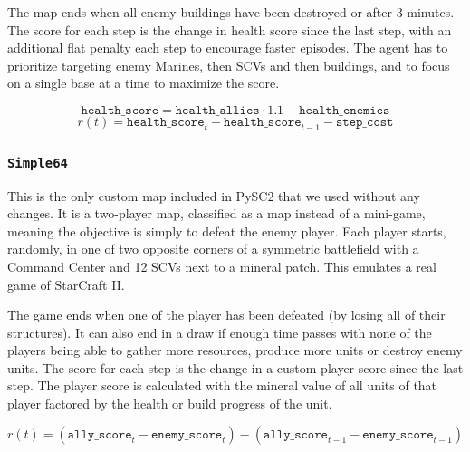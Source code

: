 The map ends when all enemy buildings have been destroyed or after 3 minutes. The score for each step is the change in health score since the last step, with an additional flat penalty each step to encourage faster episodes. The agent has to prioritize targeting enemy Marines, then SCVs and then buildings, and to focus on a single base at a time to maximize the score.

$$
\texttt{health\_score} = \texttt{health\_allies} \cdot 1.1 - \texttt{health\_enemies}
$$
$$
r(t) = \texttt{health\_score}_{t} - \texttt{health\_score}_{t-1} - \texttt{step\_cost}
$$

\subsubsection*{\texttt{Simple64}}

This is the only custom map included in PySC2 that we used without any changes. It is a two-player map, classified as a  map instead of a mini-game, meaning the objective is simply to defeat the enemy player. Each player starts, randomly, in one of two opposite corners of a symmetric battlefield with a Command Center and 12 SCVs next to a mineral patch. This emulates a real game of StarCraft II.

The game ends when one of the player has been defeated (by losing all of their structures). It can also end in a draw if enough time passes with none of the players being able to gather more resources, produce more units or destroy enemy units. The score for each step is the change in a custom player score since the last step. The player score is calculated with the mineral value of all units of that player factored by the health or build progress of the unit.

$$
r(t) = (\texttt{ally\_score}_{t} - \texttt{enemy\_score}_{t}) - (\texttt{ally\_score}_{t-1} - \texttt{enemy\_score}_{t-1})
$$